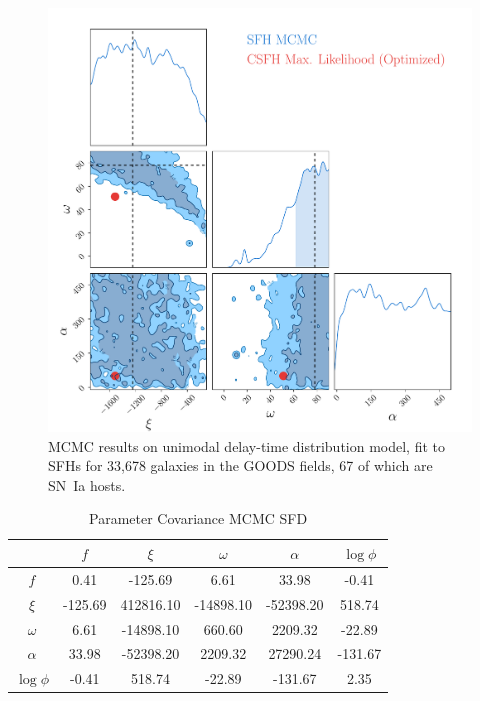 \documentclass[apj]{aastex62}
\begin{document}
\begin{figure}[t] %
   \centering
   \includegraphics[width=6.5in]{figure_sfh_corners} 
   \caption{\footnotesize MCMC results on unimodal delay-time distribution model, fit to SFHs for 33,678 galaxies in the GOODS fields, 67 of which are SN~Ia hosts.}
   \label{fig:mcmc_sfh}
\end{figure}

\begin{table}
    \centering
    \caption{Parameter Covariance MCMC SFD}
    \label{tab:parameter_covariance2}
    \begin{tabular}{c|ccccc}
         & $f$ & $\xi$ & $\omega$ & $\alpha$ & $\log \phi$\\ 
        \hline
              $f$ &  0.41 & -125.69 &  6.61 & 33.98 & -0.41 \\ 
            $\xi$ & -125.69 & 412816.10 & -14898.10 & -52398.20 & 518.74 \\ 
         $\omega$ &  6.61 & -14898.10 & 660.60 & 2209.32 & -22.89 \\ 
         $\alpha$ & 33.98 & -52398.20 & 2209.32 & 27290.24 & -131.67 \\ 
        $\log \phi$ & -0.41 & 518.74 & -22.89 & -131.67 &  2.35 \\ 
        \hline
    \end{tabular}
\end{table}

{}
\end{document}
